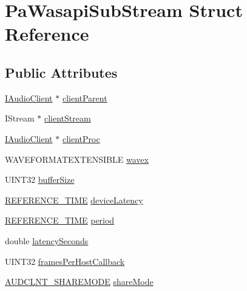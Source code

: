 \hypertarget{struct_pa_wasapi_sub_stream}{}\section{Pa\+Wasapi\+Sub\+Stream Struct Reference}
\label{struct_pa_wasapi_sub_stream}
\subsection*{Public Attributes}
\begin{DoxyCompactItemize}
\item 
\hyperlink{audioclient_8h_ace13012ab56d9326b7aabeab5d477652}{I\+Audio\+Client} $\ast$ \hyperlink{struct_pa_wasapi_sub_stream_ad21bfcde276613bdfd3d7950b9ea7755}{client\+Parent}
\item 
I\+Stream $\ast$ \hyperlink{struct_pa_wasapi_sub_stream_a218a9cb87b0ea5fcc68a1c04058d1923}{client\+Stream}
\item 
\hyperlink{audioclient_8h_ace13012ab56d9326b7aabeab5d477652}{I\+Audio\+Client} $\ast$ \hyperlink{struct_pa_wasapi_sub_stream_a0a866d34fa348461a94eee93dbc7769e}{client\+Proc}
\item 
W\+A\+V\+E\+F\+O\+R\+M\+A\+T\+E\+X\+T\+E\+N\+S\+I\+B\+LE \hyperlink{struct_pa_wasapi_sub_stream_a67dc95f3c6d0de9a8f7e85e5a98daada}{wavex}
\item 
U\+I\+N\+T32 \hyperlink{struct_pa_wasapi_sub_stream_ae3cbfddfe0db9949574f9ca11d7708fc}{buffer\+Size}
\item 
\hyperlink{ksmedia_8h_a83927f70641d4e9a344563bd9ddb15ae}{R\+E\+F\+E\+R\+E\+N\+C\+E\+\_\+\+T\+I\+ME} \hyperlink{struct_pa_wasapi_sub_stream_a06ef93d9ac069dea0fef0c40ff4b8c76}{device\+Latency}
\item 
\hyperlink{ksmedia_8h_a83927f70641d4e9a344563bd9ddb15ae}{R\+E\+F\+E\+R\+E\+N\+C\+E\+\_\+\+T\+I\+ME} \hyperlink{struct_pa_wasapi_sub_stream_acfbdb3c9c3d81b98e7338585aac06bc1}{period}
\item 
double \hyperlink{struct_pa_wasapi_sub_stream_a70abfd4a0f3aeef22983dfb49edb20f8}{latency\+Seconds}
\item 
U\+I\+N\+T32 \hyperlink{struct_pa_wasapi_sub_stream_ae1b80bba3ceb65c33e96962755839868}{frames\+Per\+Host\+Callback}
\item 
\hyperlink{_audio_session_types_8h_a0957067f6e0b63274f50931b31ed0ce5}{A\+U\+D\+C\+L\+N\+T\+\_\+\+S\+H\+A\+R\+E\+M\+O\+DE} \hyperlink{struct_pa_wasapi_sub_stream_ad4e1044e8ccb66d75465e791d2e34590}{share\+Mode}
\item 

\end{DoxyCompactItemize}
